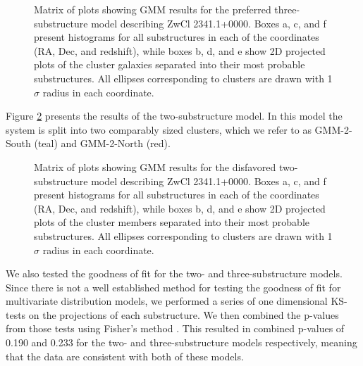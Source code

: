 \documentclass[onecolumn]{aastex}
\begin{document}
\begin{figure}  
\caption{Matrix of plots showing GMM results for the preferred three-substructure model describing ZwCl 2341.1+0000.  Boxes a, c, and f present histograms for all substructures in each of the coordinates (RA, Dec, and redshift), while boxes b, d, and e show 2D projected plots of the cluster galaxies separated into their most probable substructures.  All ellipses corresponding to clusters are drawn with 1$\sigma$ radius in each coordinate.\label{fig9}} 
\end{figure}

Figure \ref{fig10} presents the results of the two-substructure model.  In this model the system is split into two comparably sized clusters, which we refer to as GMM-2-South (teal) and GMM-2-North (red).

\begin{figure} 
\caption{Matrix of plots showing GMM results for the disfavored two-substructure model describing ZwCl 2341.1+0000.  Boxes a, c, and f present histograms for all substructures in each of the coordinates (RA, Dec, and redshift), while boxes b, d, and e show 2D projected plots of the cluster members separated into their most probable substructures.  All ellipses corresponding to clusters are drawn with 1$\sigma$ radius in each coordinate.\label{fig10}}  
\end{figure}

We also tested the goodness of fit for the two- and three-substructure models.  Since there is not a well established method for testing the goodness of fit for multivariate distribution models, we performed a series of one dimensional KS-tests on the projections of each substructure.  We then combined the p-values from those tests using Fisher's method \citep{Fisher48}.  This resulted in combined p-values of 0.190 and 0.233 for the two- and three-substructure models respectively, meaning that the data are consistent with both of these models.
\end{document}
